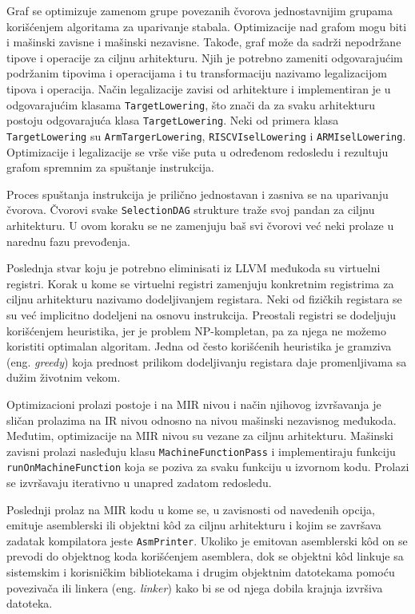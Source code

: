 \documentclass[12pt,oneside]{memoir}
\begin{document}
Graf se optimizuje zamenom grupe povezanih čvorova jednostavnijim grupama korišćenjem algoritama za uparivanje stabala. Optimizacije nad grafom mogu biti i mašinski zavisne i mašinski nezavisne. Takođe, graf može da sadrži nepodržane tipove i operacije za ciljnu arhitekturu. Njih je potrebno zameniti odgovarajućim podržanim tipovima i operacijama i tu transformaciju nazivamo legalizacijom tipova i operacija. Način legalizacije zavisi od arhitekture i implementiran je u odgovarajućim klasama \texttt{TargetLowering}, što znači da za svaku arhitekturu postoju odgovarajuća klasa \texttt{TargetLowering}. Neki od primera klasa \texttt{TargetLowering} su \texttt{ArmTargerLowering}, \texttt{RISCVIselLowering} i \texttt{ARMIselLowering}. Optimizacije i legalizacije se vrše više puta u određenom redosledu i rezultuju grafom spremnim za spuštanje
instrukcija. 

Proces spuštanja instrukcija je prilično jednostavan i zasniva se na uparivanju čvorova. Čvorovi svake \texttt{SelectionDAG} strukture traže svoj pandan za ciljnu arhitekturu. U ovom koraku se ne zamenjuju baš svi čvorovi već neki prolaze u narednu fazu prevođenja.

Poslednja stvar koju je potrebno eliminisati iz LLVM međukoda su virtuelni registri. Korak u kome se virtuelni registri zamenjuju konkretnim registrima za ciljnu arhitekturu nazivamo dodeljivanjem registara. Neki od fizičkih registara se su već implicitno dodeljeni na osnovu instrukcija. Preostali registri se dodeljuju korišćenjem heuristika, jer je problem NP-kompletan, pa za njega ne možemo koristiti optimalan algoritam. Jedna od često korišćenih heuristika je gramziva (eng. \textit{greedy}) koja prednost prilikom dodeljivanju registara daje promenljivama sa dužim životnim vekom. 

Optimizacioni prolazi postoje i na MIR nivou i način njihovog izvršavanja je sličan prolazima na IR nivou odnosno na nivou mašinski nezavisnog međukoda. Međutim, optimizacije na MIR nivou su vezane za ciljnu arhitekturu. Mašinski zavisni prolazi nasleđuju klasu \texttt{MachineFunctionPass} i implementiraju funkciju \texttt{runOnMachineFunction} koja se poziva za svaku funkciju u izvornom kodu. Prolazi se izvršavaju iterativno u unapred zadatom redosledu.

Poslednji prolaz na MIR kodu u kome se, u zavisnosti od navedenih opcija, emituje asemblerski ili objektni k\^od za ciljnu arhitekturu i kojim se završava zadatak kompilatora jeste \texttt{AsmPrinter}. Ukoliko je emitovan asemblerski k\^od on se prevodi do objektnog koda korišćenjem asemblera, dok se objektni kôd linkuje sa sistemskim i korisničkim bibliotekama i drugim objektnim datotekama pomoću povezivača ili linkera (eng. \textit{linker}) kako bi se od njega dobila krajnja izvršiva datoteka.
\end{document}
